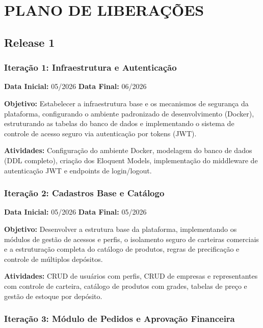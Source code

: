 \documentclass[12pt,a4paper]{article}
\begin{document}
\section{PLANO DE LIBERAÇÕES}

\subsection*{Release 1}

\subsubsection*{Iteração 1: Infraestrutura e Autenticação}

\textbf{Data Inicial:} 05/2026 \quad \textbf{Data Final:} 06/2026

\textbf{Objetivo:} Estabelecer a infraestrutura base e os mecanismos de segurança da plataforma, configurando o ambiente padronizado de desenvolvimento (Docker), estruturando as tabelas do banco de dados e implementando o sistema de controle de acesso seguro via autenticação por tokens (JWT).

\textbf{Atividades:} Configuração do ambiente Docker, modelagem do banco de dados (DDL completo), criação dos Eloquent Models, implementação do middleware de autenticação JWT e endpoints de login/logout.

\subsubsection*{Iteração 2: Cadastros Base e Catálogo}

\textbf{Data Inicial:} 05/2026 \quad \textbf{Data Final:} 05/2026

\textbf{Objetivo:} Desenvolver a estrutura base da plataforma, implementando os módulos de gestão de acessos e perfis, o isolamento seguro de carteiras comerciais e a estruturação completa do catálogo de produtos, regras de precificação e controle de múltiplos depósitos.

\textbf{Atividades:} CRUD de usuários com perfis, CRUD de empresas e representantes com controle de carteira, catálogo de produtos com grades, tabelas de preço e gestão de estoque por depósito.

\subsubsection*{Iteração 3: Módulo de Pedidos e Aprovação Financeira}
\end{document}
